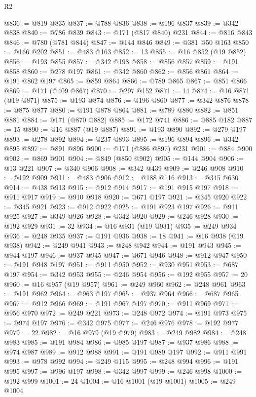 \begin{lexlean}{R2}
\begin{coremodule}
@836 := @819 @835
@837 := @788 @836
@838 := @196 @837
@839 := @342 @838
@840 := @786 @839
@843 := @171 (@817 @840) @231
@844 := @816 @843
@846 := @780 (@781 @844)
@847 := @144 @846
@849 := @381 @50 @163
@850 := @166 @202
@851 := @483 @163
@852 := 13
@855 := @16 @852 (@19 @852)
@856 := @193 @855
@857 := @342 @198
@858 := @856 @857
@859 := @191 @858
@860 := @278 @197
@861 := @342 @860
@862 := @856 @861
@864 := @191 @862 @197
@865 := @859 @864
@866 := @789 @865
@867 := @851 @866
@869 := @171 (@409 @867)
@870 := @297 @152
@871 := 14
@874 := @16 @871 (@19 @871)
@875 := @193 @874
@876 := @196 @860
@877 := @342 @876
@878 := @875 @877
@880 := @191 @878 @864
@881 := @789 @880
@882 := @851 @881
@884 := @171 (@870 @882)
@885 := @172 @741
@886 := @885 @182
@887 := 15
@890 := @16 @887 (@19 @887)
@891 := @193 @890
@892 := @279 @197
@893 := @278 @892
@894 := @237 @893
@895 := @196 @894
@896 := @342 @895
@897 := @891 @896
@900 := @171 (@886 @897) @231
@901 := @884 @900
@902 := @869 @901
@904 := @849 (@850 @902)
@905 := @144 @904
@906 := @13 @221
@907 := @340 @906
@908 := @342 @439
@909 := @246 @908
@910 := @192 @909
@911 := @483 @906
@912 := @188 @116
@913 := @345 @630
@914 := @438 @913
@915 := @912 @914
@917 := @191 @915 @197
@918 := @911 @917
@919 := @910 @918
@920 := @671 @197
@921 := @345 @920
@922 := @345 @921
@923 := @912 @922
@925 := @191 @923 @197
@926 := @911 @925
@927 := @349 @926
@928 := @342 @920
@929 := @246 @928
@930 := @192 @929
@931 := 32
@934 := @16 @931 (@19 @931)
@935 := @249 @934
@936 := @248 @935
@937 := @191 @936
@938 := 18
@941 := @16 @938 (@19 @938)
@942 := @249 @941
@943 := @248 @942
@944 := @191 @943
@945 := @944 @197
@946 := @937 @945
@947 := @671 @946
@948 := @912 @947
@950 := @191 @948 @197
@951 := @911 @950
@952 := @930 @951
@953 := @687 @197
@954 := @342 @953
@955 := @246 @954
@956 := @192 @955
@957 := 20
@960 := @16 @957 (@19 @957)
@961 := @249 @960
@962 := @248 @961
@963 := @191 @962
@964 := @963 @197
@965 := @937 @964
@966 := @687 @965
@967 := @912 @966
@969 := @191 @967 @197
@970 := @911 @969
@971 := @956 @970
@972 := @249 @221
@973 := @248 @972
@974 := @191 @973
@975 := @974 @197
@976 := @342 @975
@977 := @246 @976
@978 := @192 @977
@979 := 22
@982 := @16 @979 (@19 @979)
@983 := @249 @982
@984 := @248 @983
@985 := @191 @984
@986 := @985 @197
@987 := @937 @986
@988 := @974 @987
@989 := @912 @988
@991 := @191 @989 @197
@992 := @911 @991
@993 := @978 @992
@994 := @249 @115
@995 := @248 @994
@996 := @191 @995
@997 := @996 @197
@998 := @342 @997
@999 := @246 @998
@1000 := @192 @999
@1001 := 24
@1004 := @16 @1001 (@19 @1001)
@1005 := @249 @1004

\end{coremodule}
\end{lexlean}
